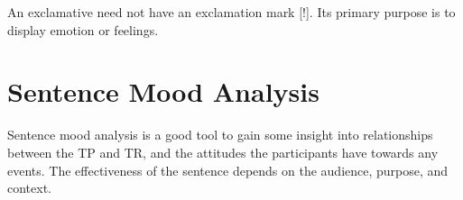 \documentclass[../main.tex]{subfiles}
\begin{document}
		An exclamative need not have an exclamation mark [!]. Its primary purpose is to display emotion or feelings.

	\section{Sentence Mood Analysis}
	Sentence mood analysis is a good tool to gain some insight into relationships between the TP and TR, and the attitudes the participants have towards any events. The effectiveness of the sentence depends on the audience, purpose, and context.
	
\end{document}
